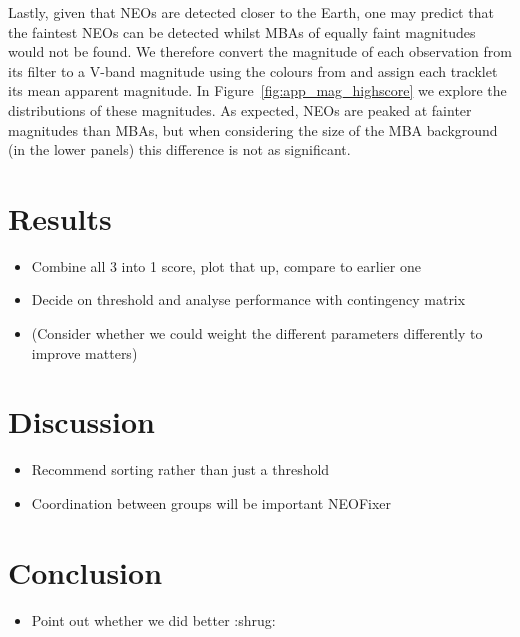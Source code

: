 \documentclass[preprint2, twocolappendix]{aastex631}
\begin{document}
Lastly, given that NEOs are detected closer to the Earth, one may predict that the faintest NEOs can be detected whilst MBAs of equally faint magnitudes would not be found. We therefore convert the magnitude of each observation from its filter to a V-band magnitude using the colours from \citet{Jones+2018} and assign each tracklet its mean apparent magnitude. In Figure~\ref{fig:app_mag_highscore} we explore the distributions of these magnitudes. As expected, NEOs are peaked at fainter magnitudes than MBAs, but when considering the size of the MBA background (in the lower panels) this difference is not as significant.

\section{Results}

\begin{itemize}
    \item Combine all 3 into 1 score, plot that up, compare to earlier one
    \item Decide on threshold and analyse performance with contingency matrix
    \item (Consider whether we could weight the different parameters differently to improve matters)
\end{itemize}

\section{Discussion}

\begin{itemize}
    \item Recommend sorting rather than just a threshold
    \item Coordination between groups will be important NEOFixer
\end{itemize}

\section{Conclusion}

\begin{itemize}
    \item Point out whether we did better :shrug:
\end{itemize}


{}

\clearpage

\appendix
\end{document}
